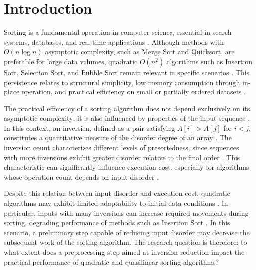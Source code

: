 \documentclass[namedate,webpdf,contemporary,large]{TBench-template}%
\theoremstyle{thmstyleone}%
\theoremstyle{thmstyletwo}%
\theoremstyle{thmstylethree}%
\begin{document}
\section{Introduction}\label{sec:intro}
Sorting is a fundamental operation in computer science, essential in search systems, databases, and real-time applications \cite{knuth_art_1973,sedgewick_algorithms_2011}. Although methods with $O(n \log n)$ asymptotic complexity, such as Merge Sort and Quicksort, are preferable for large data volumes, quadratic $O(n^2)$ algorithms such as Insertion Sort, Selection Sort, and Bubble Sort remain relevant in specific scenarios \cite{cormen_introduction_2022}. This persistence relates to structural simplicity, low memory consumption through in-place operation, and practical efficiency on small or partially ordered datasets \cite{cormen_introduction_2022,ziviani_projeto_2021}.

The practical efficiency of a sorting algorithm does not depend exclusively on its asymptotic complexity; it is also influenced by properties of the input sequence \cite{estivill-castro_survey_1992}. In this context, an inversion, defined as a pair satisfying $A[i] > A[j]$ for $i < j$, constitutes a quantitative measure of the disorder degree of an array \cite{knuth_art_1973,mannila_measures_1984}. The inversion count characterizes different levels of presortedness, since sequences with more inversions exhibit greater disorder relative to the final order \cite{mannila_measures_1984}. This characteristic can significantly influence execution cost, especially for algorithms whose operation count depends on input disorder \cite{estivill-castro_survey_1992}.

Despite this relation between input disorder and execution cost, quadratic algorithms may exhibit limited adaptability to initial data conditions \cite{mannila_measures_1984,estivill-castro_survey_1992}. In particular, inputs with many inversions can increase required movements during sorting, degrading performance of methods such as Insertion Sort \cite{cormen_introduction_2022}. In this scenario, a preliminary step capable of reducing input disorder may decrease the subsequent work of the sorting algorithm. The research question is therefore: to what extent does a preprocessing step aimed at inversion reduction impact the practical performance of quadratic and quasilinear sorting algorithms?
\end{document}
